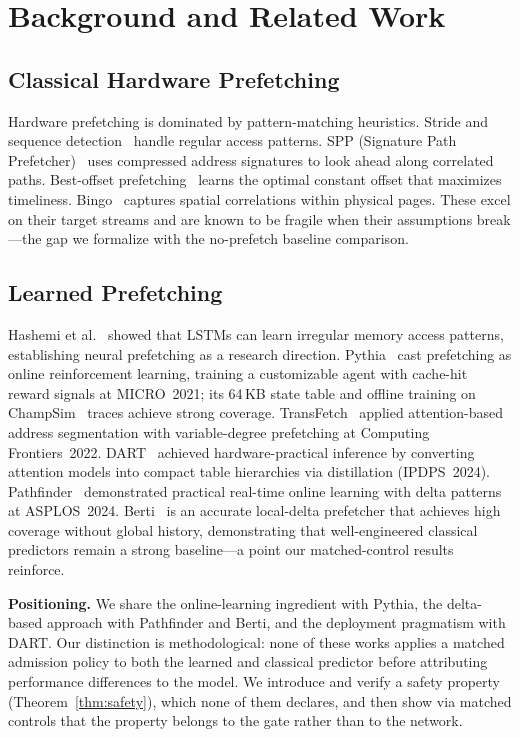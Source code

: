 \documentclass[sigplan,anonymous,review,nonacm]{acmart}
\begin{document}
\section{Background and Related Work}
\label{sec:related}

\subsection{Classical Hardware Prefetching}

Hardware prefetching is dominated by pattern-matching heuristics. Stride and
sequence detection~\cite{chen1995} handle regular access patterns. SPP
(Signature Path Prefetcher)~\cite{kim2016spp} uses compressed address
signatures to look ahead along correlated paths. Best-offset
prefetching~\cite{michaud2016bop} learns the optimal constant offset that
maximizes timeliness. Bingo~\cite{bingo} captures spatial correlations
within physical pages. These excel on their target streams and are known to
be fragile when their assumptions break---the gap we formalize with the
no-prefetch baseline comparison.

\subsection{Learned Prefetching}

Hashemi et al.~\cite{hashemi2018} showed that LSTMs can learn irregular
memory access patterns, establishing neural prefetching as a research
direction. Pythia~\cite{pythia} cast prefetching as online reinforcement
learning, training a customizable agent with cache-hit reward signals at
MICRO~2021; its 64\,KB state table and offline training on
ChampSim~\cite{champsim} traces achieve strong coverage.
TransFetch~\cite{transfetch} applied attention-based address segmentation
with variable-degree prefetching at Computing Frontiers~2022.
DART~\cite{dart} achieved hardware-practical inference by converting
attention models into compact table hierarchies via distillation
(IPDPS~2024). Pathfinder~\cite{pathfinder} demonstrated practical real-time
online learning with delta patterns at ASPLOS~2024.
Berti~\cite{berti} is an accurate local-delta prefetcher that achieves
high coverage without global history, demonstrating that well-engineered
classical predictors remain a strong baseline---a point our
matched-control results reinforce.

\textbf{Positioning.} We share the online-learning ingredient with Pythia,
the delta-based approach with Pathfinder and Berti, and the deployment
pragmatism with DART. Our distinction is methodological: none of these works
applies a matched admission policy to both the learned and classical
predictor before attributing performance differences to the model. We
introduce and verify a safety property (Theorem~\ref{thm:safety}), which
none of them declares, and then show via matched controls that the property
belongs to the gate rather than to the network.
\end{document}
